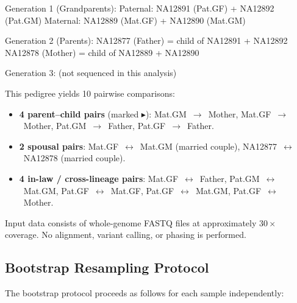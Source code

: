 \documentclass{../yalumba}
\begin{document}
\begin{pedigree}
Generation 1 (Grandparents):
  Paternal: NA12891 (Pat.GF) + NA12892 (Pat.GM)
  Maternal: NA12889 (Mat.GF) + NA12890 (Mat.GM)

Generation 2 (Parents):
  NA12877 (Father) = child of NA12891 + NA12892
  NA12878 (Mother) = child of NA12889 + NA12890

Generation 3: (not sequenced in this analysis)
\end{pedigree}

This pedigree yields 10 pairwise comparisons:

\begin{itemize}
  \item \textbf{4 parent--child pairs} (marked $\blacktriangleright$):
    Mat.GM~$\to$~Mother, Mat.GF~$\to$~Mother,
    Pat.GM~$\to$~Father, Pat.GF~$\to$~Father.
  \item \textbf{2 spousal pairs}: Mat.GF~$\leftrightarrow$~Mat.GM (married
    couple), NA12877~$\leftrightarrow$~NA12878 (married couple).
  \item \textbf{4 in-law / cross-lineage pairs}: Mat.GF~$\leftrightarrow$~Father,
    Pat.GM~$\leftrightarrow$~Mat.GM, Pat.GF~$\leftrightarrow$~Mat.GF,
    Pat.GF~$\leftrightarrow$~Mat.GM, Pat.GF~$\leftrightarrow$~Mother.
\end{itemize}

Input data consists of whole-genome FASTQ files at approximately $30\times$
coverage.  No alignment, variant calling, or phasing is performed.

\subsection{Bootstrap Resampling Protocol}

The bootstrap protocol proceeds as follows for each sample independently:
\end{document}
